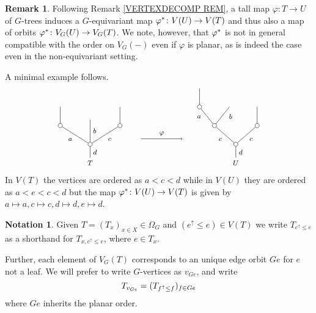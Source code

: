 \documentclass[a4paper,10pt
,draft
]{article}%
\numberwithin{equation}{section}
\numberwithin{figure}{section}
\theoremstyle{definition} %
\newtheorem{remark}[equation]{Remark}%
\newtheorem{notation}[equation]{Notation}%
\newcommand{\1}{\ensuremath{\mathbbm 1}}%
\begin{document}
\begin{remark}\label{VERTEXDECOMPG REM}
	Following Remark \ref{VERTEXDECOMP REM},
	a tall map $\varphi \colon T \to U$ of $G$-trees
	induces a $G$-equivariant map
	$\varphi^{\**} \colon V(U) \to V(T)$
	and thus also a map of orbits
	$\varphi^{\**} \colon V_G(U) \to V_G(T)$.
	We note, however, that $\varphi^{\**}$ is not in general compatible with the order on $V_G(\minus)$ even if $\varphi$ is planar, as is indeed the case even in the non-equivariant setting.

A minimal example follows.
		\[
		\begin{tikzpicture}[grow=up,auto,level distance=2.2em,
		every node/.style = {font=\footnotesize},
		dummy/.style={circle,draw,inner sep=0pt,minimum size=1.75mm}]
		\node at (0,0) {$T$}
			child{node [dummy] {}
				child[sibling distance = 3.5em]{node [dummy] {}
					child
				edge from parent node[swap] {$c$}}
				child[level distance=2.9em]{
				edge from parent node [swap] {$b$}}
				child[sibling distance = 3.5em]{node [dummy] {}
					child
				edge from parent node {$a$}}		
			edge from parent node [swap] {$d$}};
		\node at (6,0) {$U$}
			child{node [dummy] {}
				child[sibling distance = 5em]{node [dummy] {}
					child
				edge from parent node [swap] {$c$}}
				child[sibling distance = 5em]{node [dummy] {}
					child[sibling distance = 3.5em]{
					edge from parent node [swap,near end] {$b$}}
					child[sibling distance = 3.5em]{node [dummy] {}
						child
					edge from parent node [near end]{$a$}}
				edge from parent node {$e$}}
			edge from parent node [swap] {$d$}};
		\draw[->] (2.1,1) -- node [above] {$\varphi$} (3.8,1) ;
		\end{tikzpicture}
		\]
In $V(T)$ the vertices are ordered as $a<c<d$ while in $V(U)$ they are ordered as $a<e<c<d$ but the map 
$\varphi^{\**} \colon V(U) \to V(T)$ is given by 
$a \mapsto a, c \mapsto c, d \mapsto d, e \mapsto d$.
\end{remark}


\begin{notation}\label{GVERT NOT}
Given $T=(T_x)_{x \in X} \in \Omega_G$
and $(e^{\uparrow} \leq e) \in V(T)$ 
we write $T_{e^{\uparrow}\leq e}$
as a shorthand for $T_{x,e^{\uparrow}\leq e}$, where $e \in T_x$.

Further, each element of $V_G(T)$ corresponds to an unique edge orbit $Ge$ for $e$ not a leaf.
We will prefer to write $G$-vertices as $v_{Ge}$, 
and write
\begin{equation}\label{TVGE DEF}
	T_{v_{Ge}}\index{vertices/outer subtrees!Gvertexsubtree@$T_{v_{Ge}}$} = (T_{f^{\uparrow} \leq f})_{f \in Ge}
\end{equation}
where $Ge$ inherits the planar order.
\end{notation}
\end{document}
